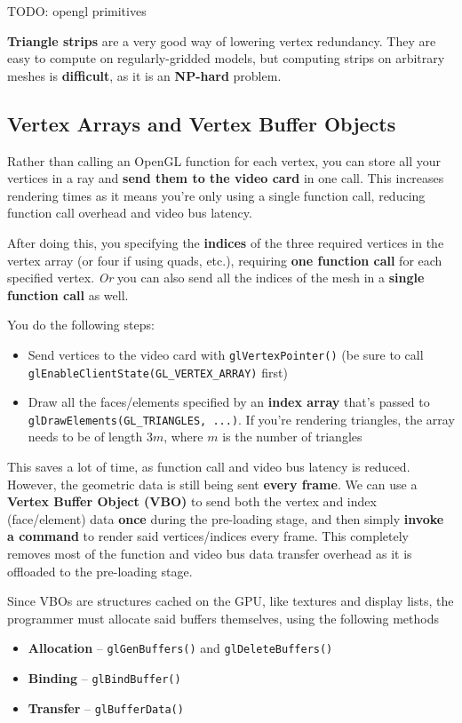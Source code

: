 \documentclass{article}
\begin{document}
TODO: opengl primitives

\textbf{Triangle strips} are a very good way of lowering vertex redundancy. They are easy to compute on regularly-gridded models, but computing strips on arbitrary meshes is \textbf{difficult}, as it is an \textbf{NP-hard} problem.

\subsection{Vertex Arrays and Vertex Buffer Objects}

Rather than calling an OpenGL function for each vertex, you can store all your vertices in a ray and \textbf{send them to the video card} in one call. This increases rendering times as it means you're only using a single function call, reducing function call overhead and video bus latency.

After doing this, you  specifying the \textbf{indices} of the three required vertices in the vertex array (or four if using quads, etc.), requiring \textbf{one function call} for each specified vertex. \textit{Or} you can also send all the indices of the mesh in a \textbf{single function call} as well.

You do the following steps:
\begin{itemize}
	\item Send vertices to the video card with \texttt{glVertexPointer()} (be sure to call \texttt{glEnableClientState(GL\_VERTEX\_ARRAY)} first)
	\item Draw all the faces/elements specified by an \textbf{index array} that's passed to \texttt{glDrawElements(GL\_TRIANGLES, ...)}. If you're rendering triangles, the array needs to be of length $3m$, where $m$ is the number of triangles
\end{itemize}

This saves a lot of time, as function call and video bus latency is reduced. However, the geometric data is still being sent \textbf{every frame}. We can use a \textbf{Vertex Buffer Object (VBO)} to send both the vertex and index (face/element) data \textbf{once} during the pre-loading stage, and then simply \textbf{invoke a command} to render said vertices/indices every frame. This completely removes most of the function and video bus data transfer overhead as it is offloaded to the pre-loading stage.

Since VBOs are structures cached on the GPU, like textures and display lists, the programmer must allocate said buffers themselves, using the following methods
\begin{itemize}
	\item \textbf{Allocation} -- \texttt{glGenBuffers()} and \texttt{glDeleteBuffers()}
	\item \textbf{Binding} -- \texttt{glBindBuffer()}
	\item \textbf{Transfer} -- \texttt{glBufferData()}
\end{itemize}
\end{document}
